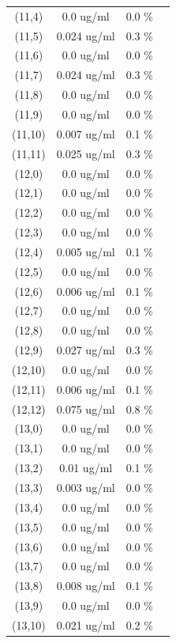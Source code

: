 \documentclass{article}
\begin{document}
\begin{tabular}{c c c c}
(11,4)&        0.0 ug/ml        &0.0 \%\\
(11,5)&        0.024 ug/ml        &0.3 \%\\
(11,6)&        0.0 ug/ml        &0.0 \%\\
(11,7)&        0.024 ug/ml        &0.3 \%\\
(11,8)&        0.0 ug/ml        &0.0 \%\\
(11,9)&        0.0 ug/ml        &0.0 \%\\
(11,10)&        0.007 ug/ml        &0.1 \%\\
(11,11)&        0.025 ug/ml        &0.3 \%\\
(12,0)&        0.0 ug/ml        &0.0 \%\\
(12,1)&        0.0 ug/ml        &0.0 \%\\
(12,2)&        0.0 ug/ml        &0.0 \%\\
(12,3)&        0.0 ug/ml        &0.0 \%\\
(12,4)&        0.005 ug/ml        &0.1 \%\\
(12,5)&        0.0 ug/ml        &0.0 \%\\
(12,6)&        0.006 ug/ml        &0.1 \%\\
(12,7)&        0.0 ug/ml        &0.0 \%\\
(12,8)&        0.0 ug/ml        &0.0 \%\\
(12,9)&        0.027 ug/ml        &0.3 \%\\
(12,10)&        0.0 ug/ml        &0.0 \%\\
(12,11)&        0.006 ug/ml        &0.1 \%\\
(12,12)&        0.075 ug/ml        &0.8 \%\\
(13,0)&        0.0 ug/ml        &0.0 \%\\
(13,1)&        0.0 ug/ml        &0.0 \%\\
(13,2)&        0.01 ug/ml        &0.1 \%\\
(13,3)&        0.003 ug/ml        &0.0 \%\\
(13,4)&        0.0 ug/ml        &0.0 \%\\
(13,5)&        0.0 ug/ml        &0.0 \%\\
(13,6)&        0.0 ug/ml        &0.0 \%\\
(13,7)&        0.0 ug/ml        &0.0 \%\\
(13,8)&        0.008 ug/ml        &0.1 \%\\
(13,9)&        0.0 ug/ml        &0.0 \%\\
(13,10)&        0.021 ug/ml        &0.2 \%\\

\end{tabular}
\end{document}
